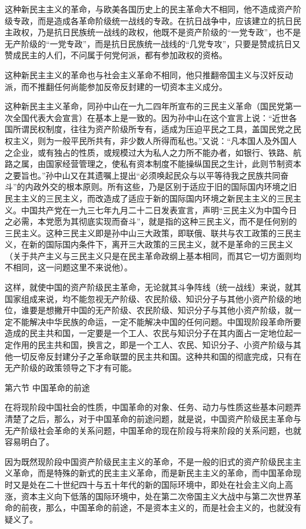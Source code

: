 \documentclass[UTF8, 12pt, a4paper]{ctexrep}
\begin{document}
这种新民主主义的革命，与欧美各国历史上的民主革命大不相同，他不造成资产阶级专政，而是造成各革命阶级统一战线的专政。在抗日战争中，应该建立的抗日民主政权，乃是抗日民族统一战线的政权，他既不是资产阶级的“一党专政”，也不是无产阶级的“一党专政”，而是抗日民族统一战线的“几党专攻”，只要是赞成抗日又赞成民主的人们，不问属于何党何派，都有参加政权的资格。

这种新民主主义的革命也与社会主义革命不相同，他只推翻帝国主义与汉奸反动派，而不推翻任何尚能参加反帝反封建的一切资本主义成分。

这种新民主主义革命，同孙中山在一九二四年所宣布的三民主义革命（国民党第一次全国代表大会宣言）在基本上是一致的。因为孙中山在这个宣言上说：“近世各国所谓民权制度，往往为资产阶级所专有，适成为压迫平民之工具，盖国民党之民权主义，则为一般平民所共有，非少数人所得而私也。”又说：“凡本国人及外国人之企业，或有独占的性质，或规模过大为私人之力所不能办者，如银行、铁路、航路之属，由国家经营管理之，使私有资本制度不能操纵国民之生计，此则节制资本之要旨也。”孙中山又在其遗嘱上提出“必须唤起民众与以平等待我之民族共同奋斗”的内政外交的根本原则。所有这些，乃是区别于适应于旧的国际国内环境之旧民主主义的三民主义，而改造成了适应于新的国际国内环境之新民主主义的三民主义。中国共产党在一九三七年九月二十二日发表宣言，声明“三民主义为中国今日之必需，本党愿为其彻底实现而奋斗”，就是指的这种三民主义，而不是任何别的三民主义。这种三民主义即是孙中山三大政策，即联俄、联共与农工政策的三民主义，在新的国际国内条件下，离开三大政策的三民主义，就不是革命的三民主义（关于共产主义与三民主义只是在民主革命政纲上基本相同，而其它一切方面则均不相同，这一问题这里不来说他）。

这样，就使中国的资产阶级民主革命，无论就其斗争阵线（统一战线）来说，就其国家组成来说，均不能忽视无产阶级、农民阶级、知识分子与其他小资产阶级的地位，谁要是想撇开中国的无产阶级、农民阶级、知识分子与其他小资产阶级，就一定不能解决中华民族的命运，一定不能解决中国的任何问题。中国现阶段革命所要造成的民主共和国，一定要是一个工人、农民与知识分子在其内面占一定地位起一定作用的民主共和国，换言之，即是一个工人、农民、知识分子、小资产阶级与其他一切反帝反封建分子之革命联盟的民主共和国。这种共和国的彻底完成，只有在无产阶级的政策领导之下才有可能。

第六节 中国革命的前途

在将现阶段中国社会的性质，中国革命的对象、任务、动力与性质这些基本问题弄清楚了之后，那么，对于中国革命的前途问题，就是说，中国资产阶级民主革命与无产阶级社会革命的关系问题，中国革命的现在阶段与将来阶段的关系问题，也就容易明白了。

因为既然现阶段中国资产阶级民主主义的革命，不是一般的旧式的资产阶级民主主义革命，而是特殊的新式的民主主义革命，而是新民主主义的革命，而中国革命现时又是处在二十世纪四十与五十年代的新的国际环境中，即处在社会主义向上高涨，资本主义向下低落的国际环境中，处在第二次帝国主义大战中与第二次世界革命的前夜，那么，中国革命的前途，不是资本主义的，而是社会主义的，也就没有疑义了。
\end{document}
